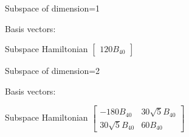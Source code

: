 \documentclass[8pt]{report}
\begin{document}
Subspace of dimension=1

Basis vectors: 
\begin{math}
[|-1/2>]
\end{math}

Subspace Hamiltonian
\begin{math}
\left[\begin{matrix}120 B_{40}\end{matrix}\right]
\end{math}


Subspace of dimension=2

Basis vectors: 
\begin{math}
[|3/2>, |-5/2>]
\end{math}

Subspace Hamiltonian
\begin{math}
\left[\begin{matrix}- 180 B_{40} & 30 \sqrt{5} B_{40}\\30 \sqrt{5} B_{40} & 60 B_{40}\end{matrix}\right]
\end{math}
\end{document}
